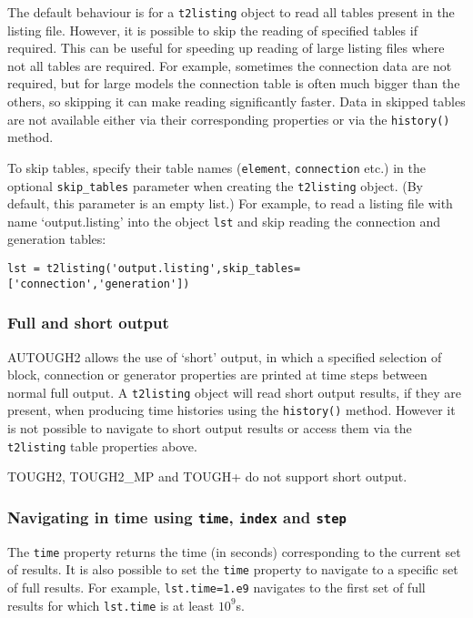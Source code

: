 The default behaviour is for a \texttt{t2listing} object to read all tables present in the listing file.  However, it is possible to skip the reading of specified tables if required.  This can be useful for speeding up reading of large listing files where not all tables are required.  For example, sometimes the connection data are not required, but for large models the connection table is often much bigger than the others, so skipping it can make reading significantly faster.  Data in skipped tables are not available either via their corresponding properties or via the \texttt{history()} method.

To skip tables, specify their table names (\texttt{element}, \texttt{connection} etc.) in the optional \texttt{skip\_tables} parameter when creating the \texttt{t2listing} object.  (By default, this parameter is an empty list.)  For example, to read a listing file with name `output.listing' into the object \texttt{lst} and skip reading the connection and generation tables:

\begin{verbatim}
lst = t2listing('output.listing',skip_tables=['connection','generation'])
\end{verbatim}

\subsubsection{Full and short output}

AUTOUGH2 allows the use of `short' output, in which a specified selection of block, connection or generator properties are printed at time steps between normal full output.  A \texttt{t2listing} object will read short output results, if they are present, when producing time histories using the \texttt{history()} method.  However it is not possible to navigate to short output results or access them via the \texttt{t2listing} table properties above.

TOUGH2, TOUGH2\_MP and TOUGH+ do not support short output.

\subsubsection{Navigating in time using \texttt{time}, \texttt{index} and \texttt{step}}

The \texttt{time} property returns the time (in seconds) corresponding to the current set of results.  It is also possible to set the \texttt{time} property to navigate to a specific set of full results.  For example, \texttt{lst.time=1.e9} navigates to the first set of full results for which \texttt{lst.time} is at least $10^9$s.

